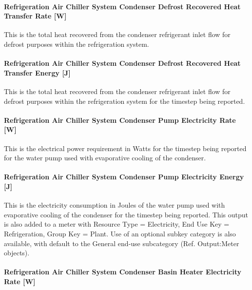 \paragraph{Refrigeration Air Chiller System Condenser Defrost Recovered Heat Transfer Rate {[}W{]}}\label{refrigeration-air-chiller-system-condenser-defrost-recovered-heat-transfer-rate-w-1}

This is the total heat recovered from the condenser refrigerant inlet flow for defrost purposes within the refrigeration system.

\paragraph{Refrigeration Air Chiller System Condenser Defrost Recovered Heat Transfer Energy {[}J{]}}\label{refrigeration-air-chiller-system-condenser-defrost-recovered-heat-transfer-energy-j-1}

This is the total heat recovered from the condenser refrigerant inlet flow for defrost purposes within the refrigeration system for the timestep being reported.

\paragraph{Refrigeration Air Chiller System Condenser Pump Electricity Rate {[}W{]}}\label{refrigeration-air-chiller-system-condenser-pump-electric-power-w}

This is the electrical power requirement in Watts for the timestep being reported for the water pump used with evaporative cooling of the condenser.

\paragraph{Refrigeration Air Chiller System Condenser Pump Electricity Energy {[}J{]}}\label{refrigeration-air-chiller-system-condenser-pump-electric-energy-j}

This is the electricity consumption in Joules of the water pump used with evaporative cooling of the condenser for the timestep being reported. This output is also added to a meter with Resource Type = Electricity, End Use Key = Refrigeration, Group Key = Plant. Use of an optional subkey category is also available, with default to the General end-use subcategory (Ref. Output:Meter objects).

\paragraph{Refrigeration Air Chiller System Condenser Basin Heater Electricity Rate {[}W{]}}\label{refrigeration-air-chiller-system-condenser-basin-heater-electric-power-w}

